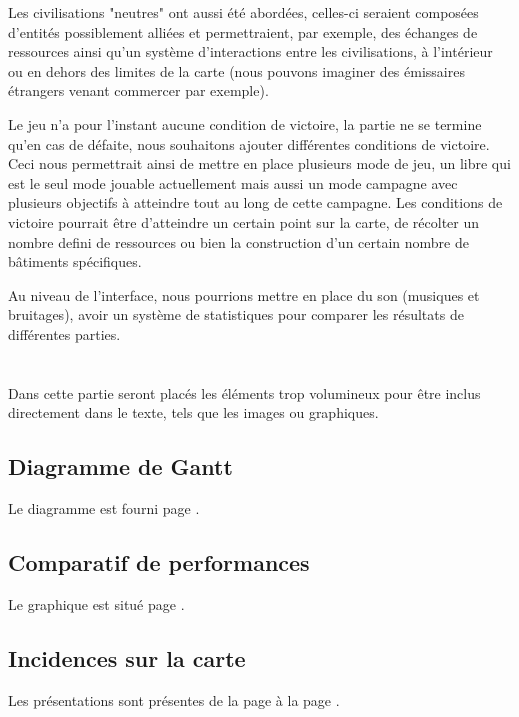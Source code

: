 \documentclass[a4paper]{memoir}
\begin{document}
			Les civilisations "neutres" ont aussi été abordées, celles-ci seraient composées d'entités possiblement alliées et permettraient, par exemple, des échanges de ressources ainsi qu'un système d'interactions entre les civilisations, à l'intérieur ou en dehors des limites de la carte (nous pouvons imaginer des émissaires étrangers venant commercer par exemple).
			
			Le jeu n'a pour l'instant aucune condition de victoire, la partie ne se termine qu'en cas de défaite, nous souhaitons ajouter différentes conditions de victoire. Ceci nous permettrait ainsi de mettre en place plusieurs mode de jeu, un libre qui est le seul mode jouable actuellement mais aussi un mode campagne avec plusieurs objectifs à atteindre tout au long de cette campagne. Les conditions de victoire pourrait être d'atteindre un certain point sur la carte, de récolter un nombre defini de ressources ou bien la construction d'un certain nombre de bâtiments spécifiques.
			
			Au niveau de l'interface, nous pourrions mettre en place du son (musiques et bruitages), avoir un système de statistiques pour comparer les résultats de différentes parties.
	
	\appendix
	\chapter{}
		Dans cette partie seront placés les éléments trop volumineux pour être inclus directement dans le texte, tels que les images ou graphiques.\\
		
		\section{Diagramme de Gantt}
			Le diagramme est fourni page \pageref{fig:gantt}.
			
		\section{Comparatif de performances}
			Le graphique est situé page \pageref{fig:analyse}.
			
		\section{Incidences sur la carte}
			Les présentations sont présentes de la page \pageref{fig:dilatation} à la page \pageref{fig:aleatoire}.
			
\end{document}
